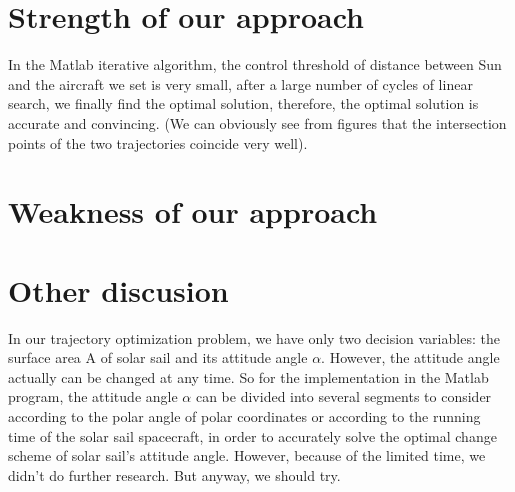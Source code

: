 \documentclass[../Paper.tex]{subfiles}
\begin{document}
\section{Strength of our approach}

In the Matlab iterative algorithm, the control threshold of distance between Sun and the aircraft we set is very small, after a large number of cycles of linear search, we finally find the optimal solution, therefore, the optimal solution is accurate and convincing. (We can obviously see from figures that the intersection points of the two trajectories coincide very well).

\section{Weakness of our approach}


\section{Other discusion}

In our trajectory optimization problem, we have only two decision variables: the surface area A of solar sail and its attitude angle $\alpha$. However, the attitude angle actually can be changed at any time. So for the implementation in the Matlab program, the attitude angle $\alpha$ can be divided into several segments to consider according to the polar angle of polar coordinates or according to the running time of the solar sail spacecraft, in order to accurately solve the optimal change scheme of solar sail's attitude angle. However, because of the limited time, we didn't do further research. But anyway, we should try.
\end{document}
